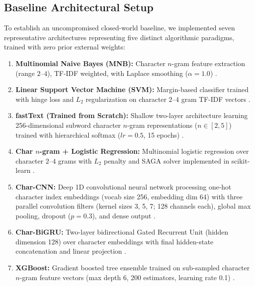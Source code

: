 \documentclass[11pt]{article}
\begin{document}
\subsection{Baseline Architectural Setup}
To establish an uncompromised closed-world baseline, we implemented seven representative architectures representing five distinct algorithmic paradigms, trained with zero prior external weights:
\begin{enumerate}
    \item \textbf{Multinomial Naive Bayes (MNB):} Character $n$-gram feature extraction (range $2$--$4$), TF-IDF weighted, with Laplace smoothing ($\alpha=1.0$) \cite{mccallum1998comparison}.
    \item \textbf{Linear Support Vector Machine (SVM):} Margin-based classifier trained with hinge loss and $L_2$ regularization on character $2$--$4$ gram TF-IDF vectors \cite{joachims1998text}.
    \item \textbf{fastText (Trained from Scratch):} Shallow two-layer architecture learning 256-dimensional subword character $n$-gram representations ($n \in [2, 5]$) trained with hierarchical softmax ($lr=0.5$, 15 epochs) \cite{joulin2017bag}.
    \item \textbf{Char $n$-gram + Logistic Regression:} Multinomial logistic regression over character $2$--$4$ grams with $L_2$ penalty and SAGA solver implemented in scikit-learn \cite{pedregosa2011scikit}.
    \item \textbf{Char-CNN:} Deep 1D convolutional neural network processing one-hot character index embeddings (vocab size 256, embedding dim 64) with three parallel convolution filters (kernel sizes 3, 5, 7; 128 channels each), global max pooling, dropout ($p=0.3$), and dense output \cite{zhang2015character}.
    \item \textbf{Char-BiGRU:} Two-layer bidirectional Gated Recurrent Unit (hidden dimension 128) over character embeddings with final hidden-state concatenation and linear projection \cite{cho2014learning}.
    \item \textbf{XGBoost:} Gradient boosted tree ensemble trained on sub-sampled character $n$-gram feature vectors (max depth 6, 200 estimators, learning rate 0.1) \cite{chen2016xgboost}.
\end{enumerate}
\end{document}
